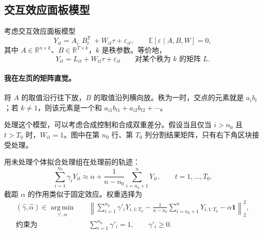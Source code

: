 \subsection{交互效应面板模型}
考虑交互效应面板模型
\[
 Y_{it}=A_{i\cdot}B_{t\cdot}^{\mathsf T}+W_{it}\tau+\varepsilon_{it},
 \qquad\mathbb E[\varepsilon\mid A,B,W]=0,\tag{8.5}
\]
其中 $A\in\mathbb R^{n\times k}$、$B\in\mathbb R^{T\times k}$，$k$ 是秩参数。等价地，
\[
 Y_{it}=L_{it}+W_{it}\tau+\varepsilon_{it}
 \qquad\text{对某个秩为 $k$ 的矩阵 }L.
\]
\paragraph{我在左页的矩阵直觉。}
将 $A$ 的取值沿行往下放，$B$ 的取值沿列横向放。秩为一时，交点的元素就是 $a_i b_t$；若 $k\ne1$，则该元素是一个和 $a_{i1}b_{t1}+a_{i2}b_{t2}+\cdots$。\begin{center}\end{center}

处理这个模型，可以考虑合成控制和合成双重差分。假设当且仅当 $i>n_0$ 且 $t>T_0$ 时，$W_{it}=1$。图中在第 $n_0$ 行、第 $T_0$ 列分割结果矩阵，只有右下角区块接受处理。
\begin{center}\end{center}


用未处理个体拟合处理组在处理前的轨迹：
\[
 \sum_{i=1}^{n_0}\gamma_iY_{it}
 \approx\alpha+\frac1{n-n_0}\sum_{i=n_0+1}^nY_{it},
 \qquad t=1,\ldots,T_0.
\]
截距 $\alpha$ 的作用类似于固定效应。权重选择为
\begin{align*}
 (\widehat\gamma,\widehat\alpha)\in
 \operatorname*{arg\,min}_{\gamma',\alpha}\quad&
 \left\|\sum_{i=1}^{n_0}\gamma'_iY_{i,1:T_0}
 -\frac1{n-n_0}\sum_{i=n_0+1}^nY_{i,1:T_0}
 -\alpha\mathbf1\right\|_2^2,\\
 \text{约束为}\quad&\sum_{i=1}^{n_0}\gamma'_i=1,
 \qquad\gamma'_i\ge0.\tag{8.7}
\end{align*}

